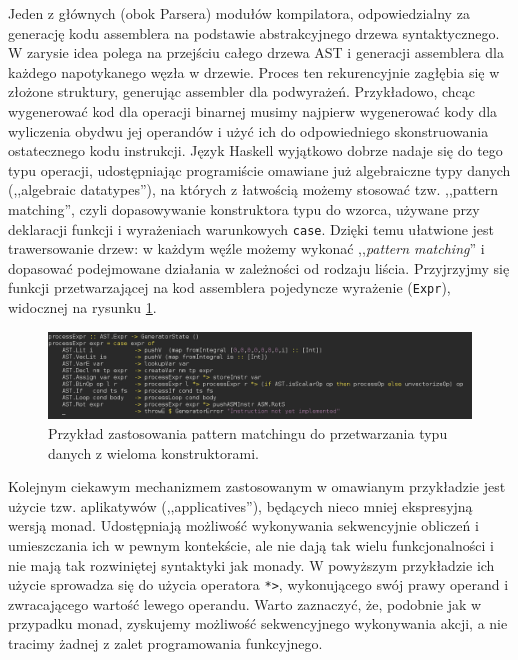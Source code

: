 Jeden z głównych (obok Parsera) modułów kompilatora, odpowiedzialny za generację kodu assemblera na podstawie abstrakcyjnego drzewa syntaktycznego. W zarysie idea polega na przejściu całego drzewa AST i generacji assemblera dla każdego napotykanego węzła w drzewie. Proces ten rekurencyjnie zagłębia się w złożone struktury, generując assembler dla podwyrażeń. Przykładowo, chcąc wygenerować kod dla operacji binarnej musimy najpierw wygenerować kody dla wyliczenia obydwu jej operandów i użyć ich do odpowiedniego skonstruowania ostatecznego kodu instrukcji. Język Haskell wyjątkowo dobrze nadaje się do tego typu operacji, udostępniając programiście omawiane już algebraiczne typy danych (,,algebraic datatypes''), na których z łatwością możemy stosować tzw. ,,pattern matching'', czyli dopasowywanie konstruktora typu do wzorca, używane przy deklaracji funkcji i wyrażeniach warunkowych \texttt{case}. Dzięki temu ułatwione jest trawersowanie drzew: w każdym węźle możemy wykonać ,,\textit{pattern matching}'' i dopasować podejmowane działania w zależności od rodzaju liścia. Przyjrzyjmy się funkcji przetwarzającej na kod assemblera pojedyncze wyrażenie (\texttt{Expr}), widocznej na rysunku \ref{fig:processExpr}.

\begin{figure}
  \begin{center}
    \includegraphics[scale=0.5]{images/processExpr.png}
    \caption{Przykład zastosowania pattern matchingu do przetwarzania typu danych z wieloma konstruktorami.}
    \label{fig:processExpr}
  \end{center}
\end{figure}

Kolejnym ciekawym mechanizmem zastosowanym w omawianym przykładzie jest użycie tzw. aplikatywów (,,applicatives''), będących nieco mniej ekspresyjną wersją monad. Udostępniają możliwość wykonywania sekwencyjnie obliczeń i umieszczania ich w pewnym kontekście, ale nie dają tak wielu funkcjonalności i nie mają tak rozwiniętej syntaktyki jak monady. W powyższym przykładzie ich użycie sprowadza się do użycia operatora \texttt{*>}, wykonującego swój prawy operand i zwracającego wartość lewego operandu. Warto zaznaczyć, że, podobnie jak w przypadku monad, zyskujemy możliwość sekwencyjnego wykonywania akcji, a nie tracimy żadnej z zalet programowania funkcyjnego.

